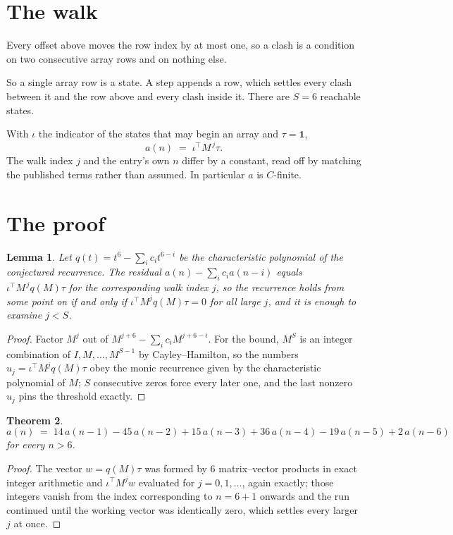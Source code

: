 \documentclass[11pt,a4paper]{article}
\theoremstyle{plain}
\newtheorem{theorem}{Theorem}
\newtheorem{lemma}[theorem]{Lemma}
\theoremstyle{definition}
\begin{document}
\section{The walk}

Every offset above moves the row index by at most one, so a clash is a condition on two
consecutive array rows and on nothing else.

So a single array row is a state. A step appends a row, which settles every clash between it
and the row above and every clash inside it. There are $S=6$ reachable states.

With $\iota$ the indicator of the states that may begin an array and $\tau=\mathbf{1}$,
\[
a(n)\;=\;\iota^{\!\top}M^{\,j}\tau .
\]
The walk index $j$ and the entry's own $n$ differ by a constant, read off by matching the
published terms rather than assumed. In particular $a$ is $C$-finite.

\section{The proof}

\begin{lemma}\label{lem:crit}
Let $q(t)=t^{6}-\sum_i c_it^{6-i}$ be the characteristic polynomial of the
conjectured recurrence. The residual $a(n)-\sum_ic_ia(n-i)$ equals
$\iota^{\!\top}M^{\,j}q(M)\tau$ for the corresponding walk index $j$, so the recurrence
holds from some point on if and only if $\iota^{\!\top}M^{j}q(M)\tau=0$ for all large $j$,
and it is enough to examine $j<S$.
\end{lemma}

\begin{proof}
Factor $M^{j}$ out of $M^{j+6}-\sum_ic_iM^{j+6-i}$. For the bound, $M^{S}$
is an integer combination of $I,M,\dots,M^{S-1}$ by Cayley--Hamilton, so the numbers
$u_j=\iota^{\!\top}M^{j}q(M)\tau$ obey the monic recurrence given by the characteristic
polynomial of $M$; $S$ consecutive zeros force every later one, and the last nonzero $u_j$
pins the threshold exactly.
\end{proof}

\begin{theorem}
\[
a(n)\;=\;14\,a(n-1) - 45\,a(n-2) + 15\,a(n-3) + 36\,a(n-4) - 19\,a(n-5) + 2\,a(n-6)
\]
for every $n>6$.
\end{theorem}

\begin{proof}
The vector $w=q(M)\tau$ was formed by $6$ matrix--vector products in exact integer
arithmetic and $\iota^{\!\top}M^{j}w$ evaluated for $j=0,1,\dots$, again exactly; those
integers vanish from the index corresponding to $n=6+1$ onwards and the run continued
until the working vector was identically zero, which settles every larger $j$ at once.
\end{proof}
\end{document}
